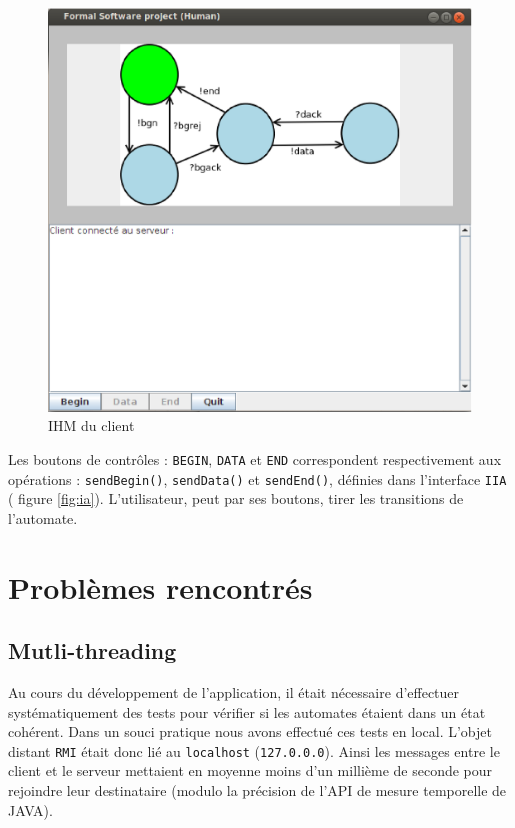  \begin{figure}[htb]
   \centering
   \includegraphics[scale=.5]{img/ihmCLIENT.eps}
   \caption{IHM du client}
   \label{fig:ihmCLIENT}
 \end{figure}
Les boutons de contrôles :  \texttt{BEGIN}, \texttt{DATA} et \texttt{END} correspondent respectivement aux opérations : \texttt{sendBegin()}, \texttt{sendData()} et \texttt{sendEnd()}, définies dans l'interface \texttt{IIA} (\cf{} figure \ref{fig:ia}). L'utilisateur, peut par ses boutons, \og tirer \fg{} les transitions de l'automate.

\section{Problèmes rencontrés}
\subsection{Mutli-threading}
Au cours du développement de l'application, il était nécessaire d'effectuer systématiquement des tests pour vérifier si les automates étaient dans un état cohérent. Dans un souci pratique nous avons effectué ces tests en local. L'objet \og distant \fg{} \texttt{RMI} était donc lié au \texttt{localhost} (\verb+127.0.0.0+). Ainsi les messages entre le client et le serveur mettaient en moyenne moins d'un millième de seconde pour rejoindre leur destinataire (modulo la précision de l'API de mesure temporelle de \textsc{JAVA}).

